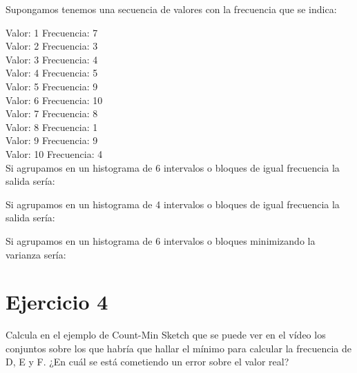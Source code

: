 \documentclass{uimppracticas}
\begin{document}
Supongamos tenemos una secuencia de valores con la frecuencia que se indica:

Valor: 1 Frecuencia: 7\\
Valor: 2 Frecuencia: 3\\
Valor: 3 Frecuencia: 4\\
Valor: 4 Frecuencia: 5\\
Valor: 5 Frecuencia: 9\\
Valor: 6 Frecuencia: 10\\
Valor: 7 Frecuencia: 8\\
Valor: 8 Frecuencia: 1\\
Valor: 9 Frecuencia: 9\\
Valor: 10 Frecuencia: 4\\

Si agrupamos en un histograma de 6 intervalos o bloques de igual frecuencia la salida sería:

Si agrupamos en un histograma de 4 intervalos o bloques de igual frecuencia la salida sería:

Si agrupamos en un histograma de 6 intervalos o bloques minimizando la varianza sería:

\section{Ejercicio 4}

Calcula en el ejemplo de Count-Min Sketch que se puede ver en el vídeo los conjuntos sobre los que habría que hallar el mínimo para calcular la frecuencia de D, E y F. ¿En cuál se está cometiendo un error sobre el valor real?

\lstlistoflistings
\end{document}
